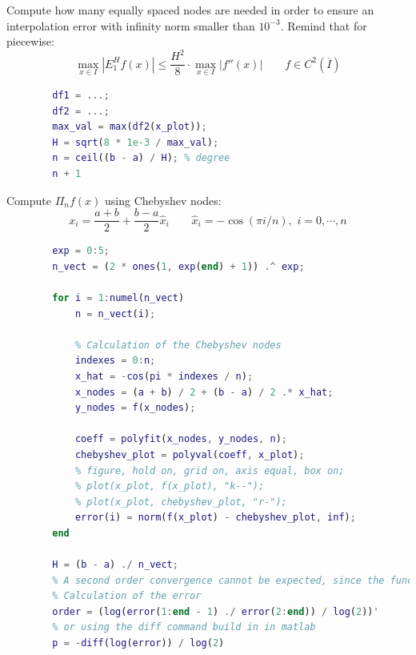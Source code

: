         Compute how many equally spaced nodes are needed in order to ensure an interpolation error with infinity norm smaller than $10^{-3}$. Remind that for piecewise:
        $$
        \max_{x\in I}\left|E_1^Hf(x)\right|
        \leq
        \frac{
            H^2
        }{
            8
        }\cdot
        \max_{x\in I}\left|
            f''(x)
        \right|\qquad
        f\in C^2(\overline{I})
        $$
        \begin{lstlisting}[language=Matlab, escapeinside=`', gobble=8]
        % or use the formula
        df1 = ...;
        df2 = ...;
        max_val = max(df2(x_plot));
        H = sqrt(8 * 1e-3 / max_val);
        n = ceil((b - a) / H); % degree
        n + 1
        \end{lstlisting}

        Compute $\Pi_nf(x)$ using Chebyshev nodes:
        $$
        x_i=\frac{a+b}{2}+\frac{b-a}{2}\hat{x}_i
        \qquad
        \hat{x}_i=-\cos(\pi i/n),\,\,i=0,\cdots,n
        $$
        \begin{lstlisting}[language=Matlab, escapeinside=`', gobble=8]
        % Chebyshev nodes
        exp = 0:5;
        n_vect = (2 * ones(1, exp(end) + 1)) .^ exp;
        
        for i = 1:numel(n_vect)
            n = n_vect(i);
        
            % Calculation of the Chebyshev nodes
            indexes = 0:n;
            x_hat = -cos(pi * indexes / n);
            x_nodes = (a + b) / 2 + (b - a) / 2 .* x_hat;
            y_nodes = f(x_nodes);
        
            coeff = polyfit(x_nodes, y_nodes, n);
            chebyshev_plot = polyval(coeff, x_plot);
            % figure, hold on, grid on, axis equal, box on;
            % plot(x_plot, f(x_plot), "k--");
            % plot(x_plot, chebyshev_plot, "r-");
            error(i) = norm(f(x_plot) - chebyshev_plot, inf);
        end
        
        H = (b - a) ./ n_vect;
        % A second order convergence cannot be expected, since the function is not smooth enough.
        % Calculation of the error
        order = (log(error(1:end - 1) ./ error(2:end)) / log(2))'
        % or using the diff command build in in matlab
        p = -diff(log(error)) / log(2)            
        \end{lstlisting}
        

